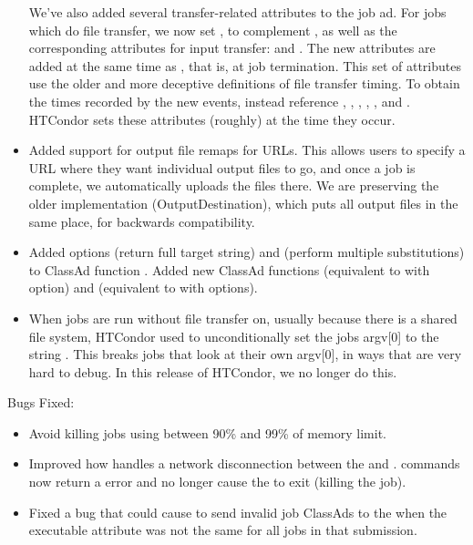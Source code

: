 \begin{itemize}
We've also added several transfer-related attributes to the job ad.  For jobs
which do file transfer, we now set
, to complement
, as well as the corresponding
attributes for input transfer:
 and
.  The new attributes are added at
the same time as , that is, at
job termination.  This set of attributes use the older and more deceptive
definitions of file transfer timing.  To obtain the times recorded by the
new events, instead reference ,
, ,
, , and
.  HTCondor sets these attributes (roughly) at
the time they occur.

\item Added support for output file remaps for URLs. This allows users to 
specify a URL where they want individual output files to go, and once a job 
is complete, we automatically uploads the files there. We are preserving the 
older implementation (OutputDestination), which puts all output files in the 
same place, for backwards compatibility.

\item Added options  (return full target string) and 
(perform multiple substitutions) to ClassAd function .
Added new ClassAd functions  (equivalent to
 with  option) and 
(equivalent to  with  options).

\item When jobs are run without file transfer on, usually because there is a
shared file system, HTCondor used to unconditionally set the jobs argv[0]
to the string .  This breaks jobs that look at their own
argv[0], in ways that are very hard to debug.  In this release of HTCondor,
we no longer do this.

\end{itemize}

\noindent Bugs Fixed:

\begin{itemize}

\item Avoid killing jobs using between 90\% and 99\% of memory limit. 

\item Improved how  handles a network disconnection between
the  and .
 commands now return a error and no longer cause the
 to exit (killing the job).

\item Fixed a bug that could cause  to send invalid job ClassAds to
the  when the executable attribute was not the same for all jobs in that
submission.

\end{itemize}


